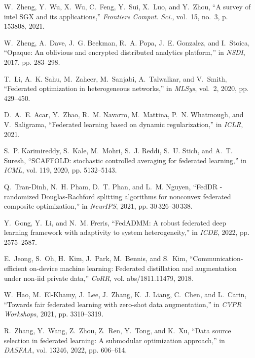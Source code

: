 \documentclass[11pt]{article}
\begin{document}
\begin{thebibliography}{10}
W.~Zheng, Y.~Wu, X.~Wu, C.~Feng, Y.~Sui, X.~Luo, and Y.~Zhou, ``A survey of
  intel {SGX} and its applications,'' \emph{Frontiers Comput. Sci.}, vol.~15,
  no.~3, p. 153808, 2021.

W.~Zheng, A.~Dave, J.~G. Beekman, R.~A. Popa, J.~E. Gonzalez, and I.~Stoica,
  ``Opaque: An oblivious and encrypted distributed analytics platform,'' in
  \emph{{NSDI}}, 2017, pp. 283--298.

T.~Li, A.~K. Sahu, M.~Zaheer, M.~Sanjabi, A.~Talwalkar, and V.~Smith,
  ``Federated optimization in heterogeneous networks,'' in \emph{{MLSys}},
  vol.~2, 2020, pp. 429--450.

D.~A.~E. Acar, Y.~Zhao, R.~M. Navarro, M.~Mattina, P.~N. Whatmough, and
  V.~Saligrama, ``Federated learning based on dynamic regularization,'' in
  \emph{{ICLR}}, 2021.

S.~P. Karimireddy, S.~Kale, M.~Mohri, S.~J. Reddi, S.~U. Stich, and A.~T.
  Suresh, ``{SCAFFOLD:} stochastic controlled averaging for federated
  learning,'' in \emph{{ICML}}, vol. 119, 2020, pp. 5132--5143.

Q.~Tran{-}Dinh, N.~H. Pham, D.~T. Phan, and L.~M. Nguyen, ``{FedDR} -
  randomized {Douglas-Rachford} splitting algorithms for nonconvex federated
  composite optimization,'' in \emph{NeurIPS}, 2021, pp. 30\,326--30\,338.

Y.~Gong, Y.~Li, and N.~M. Freris, ``{FedADMM}: {A} robust federated deep
  learning framework with adaptivity to system heterogeneity,'' in
  \emph{{ICDE}}, 2022, pp. 2575--2587.

E.~Jeong, S.~Oh, H.~Kim, J.~Park, M.~Bennis, and S.~Kim,
  ``Communication-efficient on-device machine learning: Federated distillation
  and augmentation under non-iid private data,'' \emph{CoRR}, vol.
  abs/1811.11479, 2018.

W.~Hao, M.~El{-}Khamy, J.~Lee, J.~Zhang, K.~J. Liang, C.~Chen, and L.~Carin,
  ``Towards fair federated learning with zero-shot data augmentation,'' in
  \emph{{CVPR} Workshops}, 2021, pp. 3310--3319.

R.~Zhang, Y.~Wang, Z.~Zhou, Z.~Ren, Y.~Tong, and K.~Xu, ``Data source selection
  in federated learning: {A} submodular optimization approach,'' in
  \emph{{DASFAA}}, vol. 13246, 2022, pp. 606--614.


\end{thebibliography}
\end{document}

